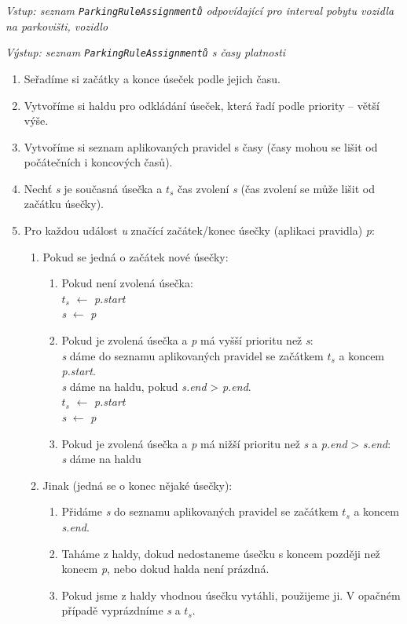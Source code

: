 \textit{Vstup: seznam \texttt{ParkingRuleAssignmentů} odpovídající pro interval pobytu vozidla na parkovišti, vozidlo}

\textit{Výstup: seznam \texttt{ParkingRuleAssignmentů} s časy platnosti}
\begin{enumerate}
  \setlength\itemsep{.05em}
  \item Seřadíme si začátky a konce úseček podle jejich času.
  \item Vytvoříme si haldu pro odkládání úseček, která řadí podle priority -- větší výše.
  \item Vytvoříme si seznam aplikovaných pravidel s časy (časy mohou se lišit od počátečních i koncových časů).
  \item Nechť \textit{s} je současná úsečka a \textit{$t_s$} čas zvolení \textit{s} (čas zvolení se může lišit od začátku úsečky).
  \item Pro každou událost \textit{u} značící začátek/konec úsečky (aplikaci pravidla) \textit{p}:
  \begin{enumerate}
    \item Pokud se jedná o začátek nové úsečky:
    \begin{enumerate}
      \item Pokud není zvolená úsečka:\\
            \textit{$t_s$} $\leftarrow$ \textit{p.start}\\
            \textit{s} $\leftarrow$ \textit{p}
      \item Pokud je zvolená úsečka a \textit{p} má vyšší prioritu než \textit{s}:\\
            \textit{s} dáme do seznamu aplikovaných pravidel se začátkem \textit{$t_s$} a koncem \textit{p.start}.\\
            \textit{s} dáme na haldu, pokud \textit{s.end} > \textit{p.end}.\\
            \textit{$t_s$} $\leftarrow$ \textit{p.start}\\
            \textit{s} $\leftarrow$ \textit{p}
      \item Pokud je zvolená úsečka a \textit{p} má nižší prioritu než \textit{s} a \textit{p.end} > \textit{s.end}:\\
            \textit{s} dáme na haldu
    \end{enumerate}
    \item Jinak (jedná se o konec nějaké úsečky):
    \begin{enumerate}
      \item Přidáme \textit{s} do seznamu aplikovaných pravidel se začátkem \textit{$t_s$} a koncem \textit{s.end}.
      \item Taháme z haldy, dokud nedostaneme úsečku s koncem později než konecm \textit{p}, nebo dokud halda není prázdná.
      \item Pokud jsme z haldy vhodnou úsečku vytáhli, použijeme ji. V opačném případě vyprázdníme \textit{s} a \textit{$t_s$}.
    \end{enumerate}
  \end{enumerate}
\end{enumerate}

